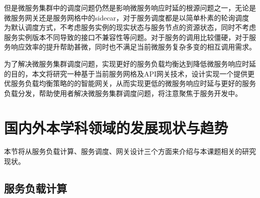 但是微服务集群中的调度问题仍然是影响微服务响应时延的根源问题之一，无论是微服务网关还是服务网格中的sidecar，对于服务调度都是以简单朴素的轮询调度为默认调度方式，不考虑服务实例的现实状态与服务节点的资源状态，同时不考虑服务实例版本不同导致的接口不兼容性等问题。对于服务的调用比较僵硬，对于服务响应效率的提升帮助甚微，同时也不满足当前微服务复杂多变的相互调用需求。

为了解决微服务集群调度问题，实现更好的服务负载均衡达到降低微服务响应时延的目的，本文将研究一种基于当前服务网格及API网关技术，设计实现一个提供更优服务负载均衡策略的的智能网关，从而实现更低的微服务响应时延与更好的服务负载分发，帮助使用者解决微服务集群调度问题，将注意聚焦于服务开发中。
\newpage

\section{国内外本学科领域的发展现状与趋势}

本节将从服务负载计算、服务调度、网关设计三个方面来介绍与本课题相关的研究现状。

\subsection{服务负载计算}


